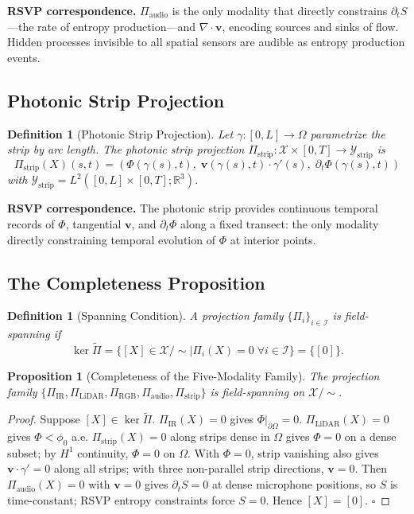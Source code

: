 \documentclass[12pt, oneside]{article}
\newtheorem{proposition}[theorem]{Proposition}
\newtheorem{definition}[theorem]{Definition}
\newcommand{\Xmod}{\mathcal{X}/{\sim}}
\newcommand{\Ftil}{\widetilde{\Pi}}
\begin{document}
\textbf{RSVP correspondence.} $\Pi_{\mathrm{audio}}$ is the only modality that directly
constrains $\partial_t S$---the rate of entropy production---and $\nabla \cdot \mathbf{v}$,
encoding sources and sinks of flow. Hidden processes invisible to all spatial sensors are
audible as entropy production events.

\subsection{Photonic Strip Projection}

\begin{definition}[Photonic Strip Projection]
Let $\gamma : [0,L] \to \Omega$ parametrize the strip by arc length. The photonic strip
projection $\Pi_{\mathrm{strip}} : \mathcal{X} \times [0,T] \to \mathcal{Y}_{\mathrm{strip}}$
is
\[
\Pi_{\mathrm{strip}}(X)(s,t) =
\left( \Phi(\gamma(s),t),\;
\mathbf{v}(\gamma(s),t) \cdot \gamma'(s),\;
\partial_t \Phi(\gamma(s),t) \right)
\]
with $\mathcal{Y}_{\mathrm{strip}} = L^2([0,L] \times [0,T];\mathbb{R}^3)$.
\end{definition}

\textbf{RSVP correspondence.} The photonic strip provides continuous temporal records of
$\Phi$, tangential $\mathbf{v}$, and $\partial_t \Phi$ along a fixed transect: the only
modality directly constraining temporal evolution of $\Phi$ at interior points.

\subsection{The Completeness Proposition}

\begin{definition}[Spanning Condition]
A projection family $\{\Pi_i\}_{i \in \mathcal{I}}$ is \emph{field-spanning} if
\[
\ker \Ftil = \{ [X] \in \Xmod \mid \Pi_i(X) = 0 \;\forall i \in \mathcal{I} \} = \{[0]\}.
\]
\end{definition}

\begin{proposition}[Completeness of the Five-Modality Family]
\label{prop:completeness}
The projection family $\{\Pi_{\mathrm{IR}}, \Pi_{\mathrm{LiDAR}}, \Pi_{\mathrm{RGB}},
\Pi_{\mathrm{audio}}, \Pi_{\mathrm{strip}}\}$ is field-spanning on $\Xmod$.
\end{proposition}

\begin{proof}
Suppose $[X] \in \ker \Ftil$. $\Pi_{\mathrm{IR}}(X) = 0$ gives
$\Phi|_{\partial\Omega} = 0$. $\Pi_{\mathrm{LiDAR}}(X) = 0$ gives $\Phi < \phi_0$
a.e. $\Pi_{\mathrm{strip}}(X) = 0$ along strips dense in $\Omega$ gives $\Phi = 0$
on a dense subset; by $H^1$ continuity, $\Phi = 0$ on $\Omega$. With $\Phi = 0$,
strip vanishing also gives $\mathbf{v} \cdot \gamma' = 0$ along all strips; with three
non-parallel strip directions, $\mathbf{v} = 0$. Then $\Pi_{\mathrm{audio}}(X) = 0$
with $\mathbf{v} = 0$ gives $\partial_t S = 0$ at dense microphone positions, so $S$
is time-constant; RSVP entropy constraints force $S = 0$. Hence $[X] = [0]$. $\square$
\end{proof}
\end{document}
